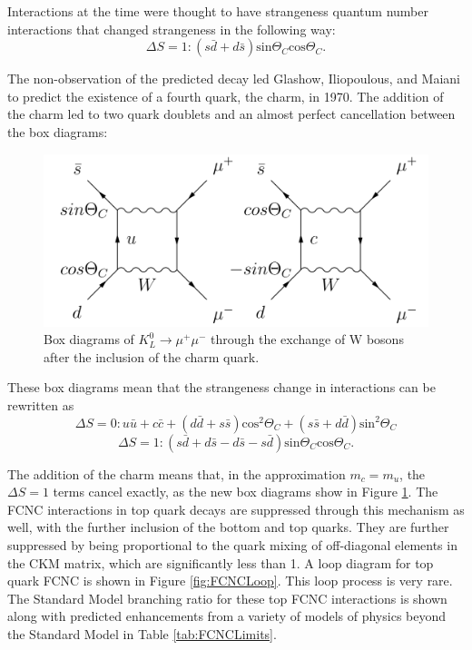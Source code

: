 Interactions at the time were thought to have strangeness quantum number interactions that changed strangeness in the following way:
\[ \Delta S =1: (s\bar{d} + d\bar{s})\text{sin}\Theta_C \text{cos}\Theta_C .  \]

The non-observation of the predicted decay led Glashow, Iliopoulous, and Maiani to predict the existence of a fourth quark, the charm, in 1970\cite{GIM}.  The addition of the charm led to two quark doublets and an almost perfect cancellation between the box diagrams:

\begin{figure}[h!]
	\centering
	\includegraphics[width=.9\columnwidth]{../ThesisImages/Theory/GIMDiagrams.png}
	\caption{Box diagrams of $K_L^0 \rightarrow \mu^+ \mu^-$ through the exchange of W bosons after the inclusion of the charm quark.}
	\label{fig:KaonBox2}
\end{figure}

These box diagrams mean that the strangeness change in interactions can be rewritten as 
\[ \Delta S=0 : u\bar{u} + c\bar{c} +(d\bar{d}+s\bar{s})\text{cos}^2\Theta_C + (s\bar{s}+d\bar{d}) \text{sin}^2\Theta_C \]\[
\Delta S =1: (s\bar{d} + d\bar{s} -d\bar{s}-s\bar{d})\text{sin}\Theta_C \text{cos}\Theta_C .  \]

The addition of the charm means that, in the approximation $m_c = m_u$, the $\Delta S =1$ terms cancel exactly, as the new box diagrams show in Figure \ref{fig:KaonBox2}.  The FCNC interactions in top quark decays are suppressed through this mechanism as well, with the further inclusion of the bottom and top quarks.  They are further suppressed by being proportional to the quark mixing of off-diagonal elements in the CKM matrix, which are significantly less than 1.  A loop diagram for top quark FCNC is shown in Figure \ref{fig:FCNCLoop}.  This loop process is very rare.  The Standard Model branching ratio for these top FCNC interactions is shown along with predicted enhancements from a variety of models of physics beyond the Standard Model in Table \ref{tab:FCNCLimits}.

